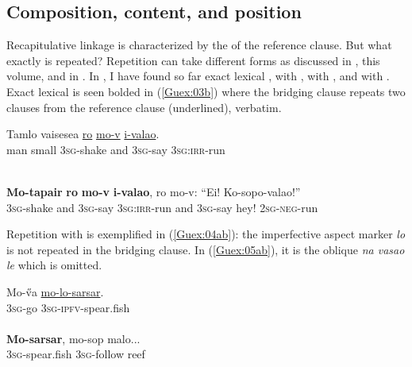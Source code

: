 \documentclass[output=paper]{LSP/langsci}
\begin{document}
\subsection{Composition, content, and position} 
\label{Gusec:Composition}
Recapitulative linkage is characterized by the  of the reference clause. But what exactly is repeated? Repetition can take different forms as discussed in \citeauthor{guerin18}, this volume, and in \citet[][224]{brown.2000}. In , I have found so far exact lexical ,  with , with , and  with .  Exact lexical  is seen bolded in (\ref{Guex:03b}) where the bridging clause repeats two clauses from the reference clause (underlined), verbatim. 

\begin{exe}
\ex \label{Guex:03ab}
\begin{xlist}
\ex \label{Guex:03a}
\gll Tamlo   vaisesea   \underline{}   \underline{ro}    \underline{mo-v}       \underline{i-valao}.\\
man     small      \textsc{3sg}-shake    and   \textsc{3sg}-say   \textsc{3sg}:\textsc{irr}-run\\
\glt {}\\

\pagebreak

\ex \label{Guex:03b}
\gll \textbf{Mo-tapair}   \textbf{ro}     \textbf{mo-v}       \textbf{i-valao}, ro mo-v:     ``Ei!  Ko-sopo-valao!''\\     	       
    \textsc{3sg}-shake    and   \textsc{3sg}-say   \textsc{3sg:irr}-run    and \textsc{3sg}-say   {hey!  \textsc{2sg-neg}-run}\\
\glt {} 
\end{xlist}
\end{exe}

Repetition with  is exemplified in (\ref{Guex:04ab}): the imperfective aspect marker \textit{lo} is not repeated in the bridging clause. In (\ref{Guex:05ab}), it is the oblique \textit{na vasao le} which is omitted.

\begin{exe}
\ex \label{Guex:04ab}
\begin{xlist}
\ex \label{Guex:04a}
\gll Mo-\H{v}a \underline{mo-lo-sarsar}.\\
\textsc{3sg}-go     \textsc{3sg}-\textsc{ipfv}-spear.fish\\
\glt {}\\
\ex \label{Guex:04b}
\gll \textbf{Mo-sarsar},   mo-sop         malo...\\     	       
    \textsc{3sg}-spear.fish    \textsc{3sg}-follow   reef \\
\glt {} 
\end{xlist}
\end{exe}
\end{document}
